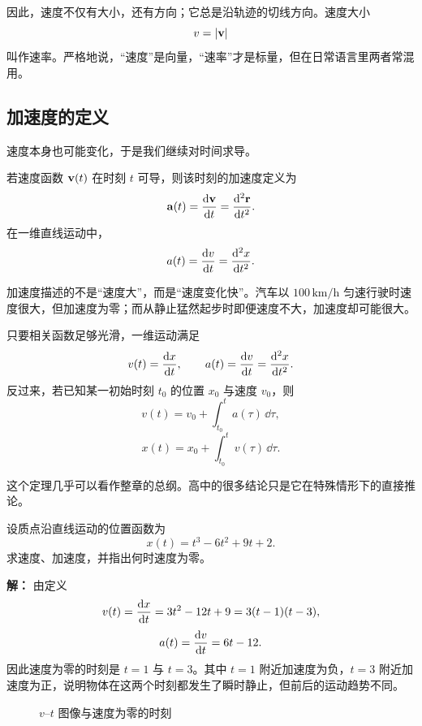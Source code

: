 因此，速度不仅有大小，还有方向；它总是沿轨迹的切线方向。速度大小
\[
 v=\left|\vb{v}\right|
\]
叫作速率。严格地说，``速度''是向量，``速率''才是标量，但在日常语言里两者常混用。

\subsection{加速度的定义}

速度本身也可能变化，于是我们继续对时间求导。

\begin{definition}[加速度]
若速度函数 $\vb{v}(t)$ 在时刻 $t$ 可导，则该时刻的加速度定义为
\[
\vb{a}(t)=\dv{\vb{v}}{t}=\dv[2]{\vb{r}}{t}.
\]
在一维直线运动中，
\[
 a(t)=\dv{v}{t}=\dv[2]{x}{t}.
\]
\end{definition}

加速度描述的不是``速度大''，而是``速度变化快''。汽车以 $100\,\text{km/h}$ 匀速行驶时速度很大，但加速度为零；而从静止猛然起步时即便速度不大，加速度却可能很大。

\begin{theorem}[位置、速度、加速度的微积分链]
只要相关函数足够光滑，一维运动满足
\[
 v(t)=\dv{x}{t},\qquad a(t)=\dv{v}{t}=\dv[2]{x}{t}.
\]
反过来，若已知某一初始时刻 $t_0$ 的位置 $x_0$ 与速度 $v_0$，则
\[
 v(t)=v_0+\int_{t_0}^{t} a(\tau)\,\dd \tau,
\]
\[
 x(t)=x_0+\int_{t_0}^{t} v(\tau)\,\dd \tau.
\]
\end{theorem}

这个定理几乎可以看作整章的总纲。高中的很多结论只是它在特殊情形下的直接推论。

\begin{example}[由位置函数求速度与加速度]
设质点沿直线运动的位置函数为
\[
 x(t)=t^3-6t^2+9t+2.
\]
求速度、加速度，并指出何时速度为零。

\textbf{解：}
由定义
\[
 v(t)=\dv{x}{t}=3t^2-12t+9=3(t-1)(t-3),
\]
\[
 a(t)=\dv{v}{t}=6t-12.
\]
因此速度为零的时刻是 $t=1$ 与 $t=3$。其中 $t=1$ 附近加速度为负，$t=3$ 附近加速度为正，说明物体在这两个时刻都发生了瞬时静止，但前后的运动趋势不同。
\end{example}

\begin{figure}[H]
\centering
{}
\caption{$v$--$t$ 图像与速度为零的时刻}
\end{figure}

